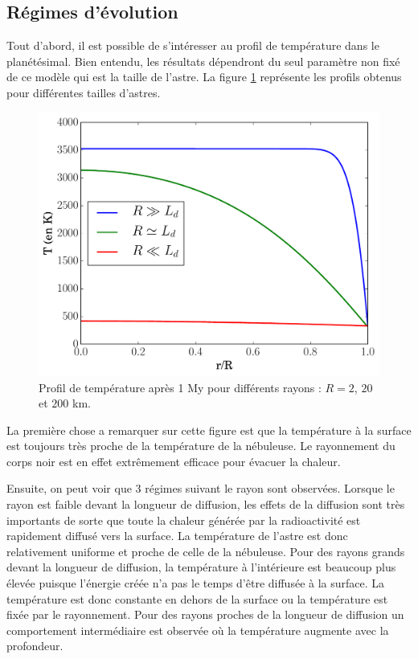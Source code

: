 \documentclass[10pt,a4paper]{article}
\numberwithin{equation}{section}
\begin{document}
\subsection{Régimes d'évolution}

Tout d'abord, il est possible de s'intéresser au profil de température dans le planétésimal. Bien entendu, les résultats dépendront du seul paramètre non fixé de ce modèle qui est la taille de l'astre. La figure \ref{diffusion2} représente les profils obtenus pour différentes tailles d'astres. 

\begin{figure}[h]
    \centering	    
	\includegraphics[scale=0.43]{figures/diffusion2.pdf}
    \caption{Profil de température après 1 My pour différents rayons : $R= 2$, $20$ et $200$ km. }
    	\label{diffusion2} 
\end{figure}

La première chose a remarquer sur cette figure est que la température à la surface est toujours très proche de la température de la nébuleuse. Le rayonnement du corps noir est en effet extrêmement efficace pour évacuer la chaleur. 
\medskip

Ensuite, on peut voir que 3 régimes suivant le rayon sont observées. Lorsque le rayon est faible devant la longueur de diffusion, les effets de la diffusion sont très importants de sorte que toute la chaleur générée par la radioactivité est rapidement diffusé vers la surface. La température de l'astre est donc relativement uniforme et proche de celle de la nébuleuse. Pour des rayons grands devant la longueur de diffusion, la température à l'intérieure est beaucoup plus élevée puisque l'énergie créée n'a pas le temps d'être diffusée à la surface. La température est donc constante en dehors de la surface ou la température est fixée par le rayonnement. Pour des rayons proches de la longueur de diffusion un comportement intermédiaire est observée où la température augmente avec la profondeur.
\end{document}
